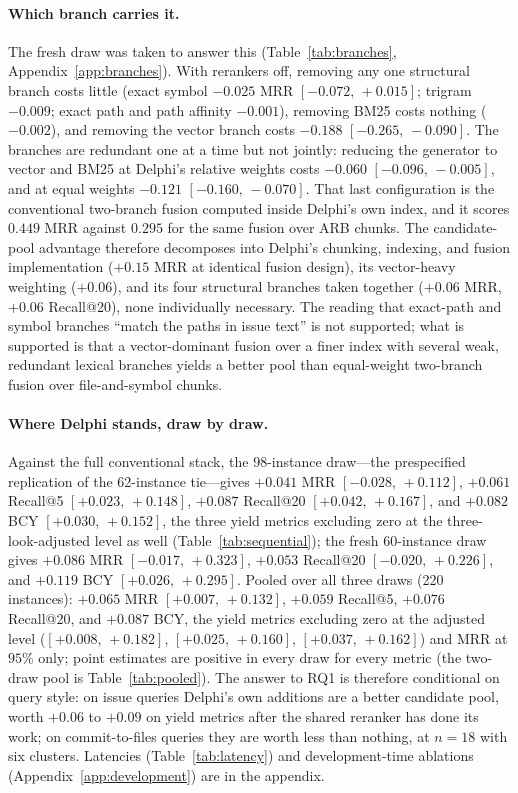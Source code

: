\documentclass{article}
\newcommand{\ci}[2]{{\footnotesize$[#1,\,#2]$}}
\newcommand{\system}{Delphi}
\begin{document}
\paragraph{Which branch carries it.} The fresh draw was taken to answer this (Table~\ref{tab:branches}, Appendix~\ref{app:branches}). With rerankers off, removing any one structural branch costs little (exact symbol $-0.025$ MRR \ci{-0.072}{+0.015}; trigram $-0.009$; exact path and path affinity $-0.001$), removing BM25 costs nothing ($-0.002$), and removing the vector branch costs $-0.188$ \ci{-0.265}{-0.090}. The branches are redundant one at a time but not jointly: reducing the generator to vector and BM25 at \system{}'s relative weights costs $-0.060$ \ci{-0.096}{-0.005}, and at equal weights $-0.121$ \ci{-0.160}{-0.070}. That last configuration is the conventional two-branch fusion computed inside \system{}'s own index, and it scores $0.449$ MRR against $0.295$ for the same fusion over ARB chunks. The candidate-pool advantage therefore decomposes into \system{}'s chunking, indexing, and fusion implementation ($+0.15$ MRR at identical fusion design), its vector-heavy weighting ($+0.06$), and its four structural branches taken together ($+0.06$ MRR, $+0.06$ Recall@20), none individually necessary. The reading that exact-path and symbol branches ``match the paths in issue text'' is not supported; what is supported is that a vector-dominant fusion over a finer index with several weak, redundant lexical branches yields a better pool than equal-weight two-branch fusion over file-and-symbol chunks.

\paragraph{Where \system{} stands, draw by draw.} Against the full conventional stack, the 98-instance draw---the prespecified replication of the 62-instance tie---gives $+0.041$ MRR \ci{-0.028}{+0.112}, $+0.061$ Recall@5 \ci{+0.023}{+0.148}, $+0.087$ Recall@20 \ci{+0.042}{+0.167}, and $+0.082$ BCY \ci{+0.030}{+0.152}, the three yield metrics excluding zero at the three-look-adjusted level as well (Table~\ref{tab:sequential}); the fresh 60-instance draw gives $+0.086$ MRR \ci{-0.017}{+0.323}, $+0.053$ Recall@20 \ci{-0.020}{+0.226}, and $+0.119$ BCY \ci{+0.026}{+0.295}. Pooled over all three draws (220 instances): $+0.065$ MRR \ci{+0.007}{+0.132}, $+0.059$ Recall@5, $+0.076$ Recall@20, and $+0.087$ BCY, the yield metrics excluding zero at the adjusted level (\ci{+0.008}{+0.182}, \ci{+0.025}{+0.160}, \ci{+0.037}{+0.162}) and MRR at $95\%$ only; point estimates are positive in every draw for every metric (the two-draw pool is Table~\ref{tab:pooled}). The answer to RQ1 is therefore conditional on query style: on issue queries \system{}'s own additions are a better candidate pool, worth $+0.06$ to $+0.09$ on yield metrics after the shared reranker has done its work; on commit-to-files queries they are worth less than nothing, at $n{=}18$ with six clusters. Latencies (Table~\ref{tab:latency}) and development-time ablations (Appendix~\ref{app:development}) are in the appendix.
\end{document}
